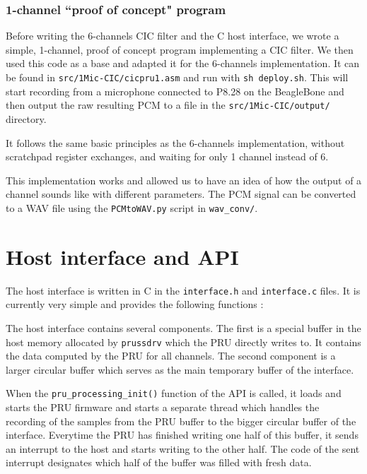 \documentclass[]{report}
\begin{document}
\hypertarget{channel-proof-of-concept-program}{%
\subsubsection{1-channel ``proof of concept"
program}\label{channel-proof-of-concept-program}}

Before writing the 6-channels CIC filter and the C host interface, we wrote a simple, 1-channel, proof of concept program implementing a CIC filter. We then used this code as a base and adapted it for the 6-channels implementation. It can be found in \texttt{src/1Mic-CIC/cic\textunderscore pru1.asm} and run with \texttt{sh deploy.sh}. This will start recording from a microphone connected to P8.28 on the BeagleBone and then output the raw resulting PCM to a file in the \texttt{src/1Mic-CIC/output/} directory.

It follows the same basic principles as the 6-channels implementation, without scratchpad register exchanges, and waiting for only 1 channel instead of 6.

This implementation works and allowed us to have an idea of how the output of a channel sounds like with different parameters. The PCM signal can be converted to a WAV file using the \texttt{PCMtoWAV.py} script in \texttt{wav\_conv/}.

\hypertarget{host-interface-and-api}{%
\section{Host interface and API}\label{host-interface-and-api}}

The host interface is written in C in the \texttt{interface.h} and
\texttt{interface.c} files. It is currently very simple and provides the
following functions :




The host interface contains several components. The first is a special buffer in the host memory allocated by \texttt{prussdrv} which the PRU directly writes to. It contains the data computed by the PRU for all channels. The second component is a larger circular buffer which serves as the main temporary buffer of the interface.

When the \texttt{pru\_processing\_init()} function of the API is called, it loads and starts the PRU firmware and starts a separate thread which handles the recording of the samples from the PRU buffer to the bigger circular buffer of the interface. Everytime the PRU has finished writing one half of this buffer, it sends an interrupt to the host and starts writing to the other half. The code of the sent interrupt designates which half of the buffer was filled with fresh data.
\end{document}
